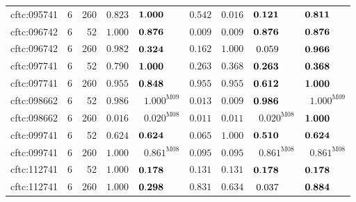 \begin{longtable}{@{}lrrrrrrrr@{}}
cftc:095741 & 6 & 260 & $\mathbf{0.823}$ & $\mathbf{1.000}\hphantom{^{\mathrm{M00}}}$ & $\mathbf{0.542}$ & $0.016$ & $\mathbf{0.121}\hphantom{^{\mathrm{M00}}}$ & $\mathbf{0.811}\hphantom{^{\mathrm{M00}}}$ \\
cftc:096742 & 6 & 52 & $\mathbf{1.000}$ & $\mathbf{0.876}\hphantom{^{\mathrm{M00}}}$ & $0.009$ & $0.009$ & $\mathbf{0.876}\hphantom{^{\mathrm{M00}}}$ & $\mathbf{0.876}\hphantom{^{\mathrm{M00}}}$ \\
cftc:096742 & 6 & 260 & $\mathbf{0.982}$ & $\mathbf{0.324}\hphantom{^{\mathrm{M00}}}$ & $\mathbf{0.162}$ & $\mathbf{1.000}$ & $0.059\hphantom{^{\mathrm{M00}}}$ & $\mathbf{0.966}\hphantom{^{\mathrm{M00}}}$ \\
cftc:097741 & 6 & 52 & $\mathbf{0.790}$ & $\mathbf{1.000}\hphantom{^{\mathrm{M00}}}$ & $\mathbf{0.263}$ & $\mathbf{0.368}$ & $\mathbf{0.263}\hphantom{^{\mathrm{M00}}}$ & $\mathbf{0.368}\hphantom{^{\mathrm{M00}}}$ \\
cftc:097741 & 6 & 260 & $\mathbf{0.955}$ & $\mathbf{0.848}\hphantom{^{\mathrm{M00}}}$ & $\mathbf{0.955}$ & $\mathbf{0.955}$ & $\mathbf{0.612}\hphantom{^{\mathrm{M00}}}$ & $\mathbf{1.000}\hphantom{^{\mathrm{M00}}}$ \\
cftc:098662 & 6 & 52 & $\mathbf{0.986}$ & $\mathbf{1.000}^{\mathrm{M09}}$ & $0.013$ & $0.009$ & $\mathbf{0.986}\hphantom{^{\mathrm{M00}}}$ & $\mathbf{1.000}^{\mathrm{M09}}$ \\
cftc:098662 & 6 & 260 & $0.016$ & $0.020^{\mathrm{M08}}$ & $0.011$ & $0.011$ & $0.020^{\mathrm{M08}}$ & $\mathbf{1.000}\hphantom{^{\mathrm{M00}}}$ \\
cftc:099741 & 6 & 52 & $\mathbf{0.624}$ & $\mathbf{0.624}\hphantom{^{\mathrm{M00}}}$ & $0.065$ & $\mathbf{1.000}$ & $\mathbf{0.510}\hphantom{^{\mathrm{M00}}}$ & $\mathbf{0.624}\hphantom{^{\mathrm{M00}}}$ \\
cftc:099741 & 6 & 260 & $\mathbf{1.000}$ & $\mathbf{0.861}^{\mathrm{M08}}$ & $0.095$ & $0.095$ & $\mathbf{0.861}^{\mathrm{M08}}$ & $\mathbf{0.861}^{\mathrm{M08}}$ \\
cftc:112741 & 6 & 52 & $\mathbf{1.000}$ & $\mathbf{0.178}\hphantom{^{\mathrm{M00}}}$ & $\mathbf{0.131}$ & $\mathbf{0.131}$ & $\mathbf{0.178}\hphantom{^{\mathrm{M00}}}$ & $\mathbf{0.178}\hphantom{^{\mathrm{M00}}}$ \\
cftc:112741 & 6 & 260 & $\mathbf{1.000}$ & $\mathbf{0.298}\hphantom{^{\mathrm{M00}}}$ & $\mathbf{0.831}$ & $\mathbf{0.634}$ & $0.037\hphantom{^{\mathrm{M00}}}$ & $\mathbf{0.884}\hphantom{^{\mathrm{M00}}}$ \\

\end{longtable}
